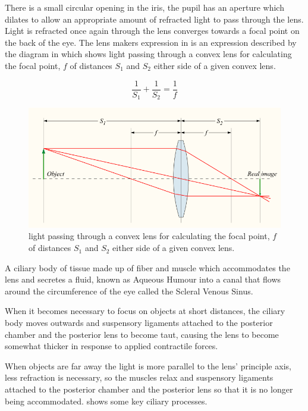 There is a small circular opening in the iris, the pupil has an aperture
which dilates to allow an appropriate amount of refracted light to pass
through the lens. Light is refracted once again through the lens converges
towards a focal point on the back of the eye. The lens makers expression
in  is an expression described by the diagram in
 which shows light passing through a convex lens
 for calculating the focal point, $f$ of distances $S_1$ and $S_2$ either
  side of a given convex lens.\cite{greivenkamp2004field}

\begin{equation}
\frac{1}{S_1} + \frac{1}{S_2} = \frac{1}{f}
\label{eq:lens_makers}
\end{equation}

\begin{figure}[htbp]
  \centering
    \includegraphics{figures/convergent_lens2}
  \caption{light passing through a convex lens for calculating the focal
  point, $f$ of distances $S_1$ and $S_2$ either side of a given convex lens.}
  \label{fig:convergent_lens}
\end{figure}

A ciliary body of tissue made up of fiber and muscle which accommodates the
lens and secretes a fluid, known as Aqueous Humour into a canal that flows
around the circumference of the eye called the Scleral Venous Sinus.
\cite{bill1970effects,dvorak1934schlemm}

When it becomes necessary to focus on objects at short distances, the
ciliary body moves outwards and suspensory ligaments attached to the
posterior chamber and the posterior lens to become taut, causing the
lens to become somewhat thicker in response to applied contractile
forces.\cite{atchison1995accommodation}

When objects are far away the light is more parallel to
the lens' principle axis, less refraction is necessary, so
the muscles relax and suspensory ligaments attached to the
posterior chamber and the posterior lens so that it is
no longer being accommodated.\cite{}
shows some key ciliary processes. 

